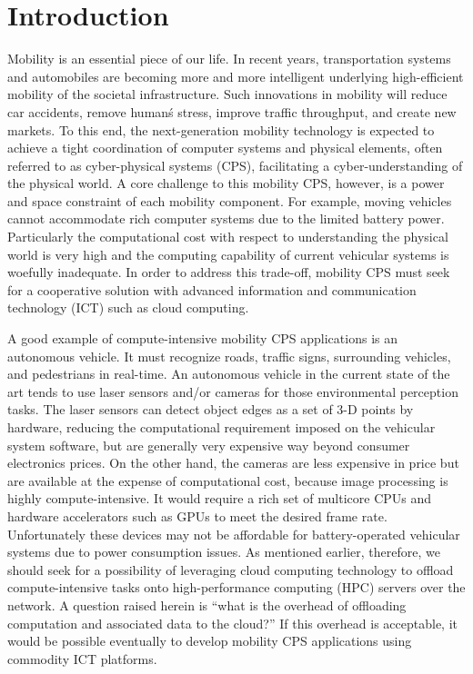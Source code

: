 \section{Introduction}
\label{sec:introduction}

Mobility is an essential piece of our life.
In recent years, transportation systems and automobiles are becoming
more and more intelligent underlying high-efficient mobility of the
societal infrastructure.
Such innovations in mobility will reduce car accidents, remove human\'s
stress, improve traffic throughput, and create new markets.
To this end, the next-generation mobility technology is expected to
achieve a tight coordination of computer systems and physical elements,
often referred to as cyber-physical systems (CPS), facilitating a
cyber-understanding of the physical world.
A core challenge to this mobility CPS, however, is a power and space
constraint of each mobility component.
For example, moving vehicles cannot accommodate rich computer systems
due to the limited battery power.
Particularly the computational cost with respect to understanding the
physical world is very high and the computing capability of current
vehicular systems is woefully inadequate.
In order to address this trade-off, mobility CPS must seek for a
cooperative solution with advanced information and communication
technology (ICT) such as cloud computing.

A good example of compute-intensive mobility CPS applications is an
autonomous vehicle.
It must recognize roads, traffic signs, surrounding vehicles, and
pedestrians in real-time.
An autonomous vehicle in the current state of the art tends to use laser
sensors and/or cameras for those environmental perception tasks.
The laser sensors can detect object edges as a set of 3-D points by
hardware, reducing the computational requirement imposed on the
vehicular system software, but are generally very expensive way beyond
consumer electronics prices.
On the other hand, the cameras are less expensive in price but are
available at the expense of computational cost, because image processing
is highly compute-intensive.
It would require a rich set of multicore CPUs and hardware accelerators
such as GPUs to meet the desired frame rate.
Unfortunately these devices may not be affordable for battery-operated
vehicular systems due to power consumption issues.
As mentioned earlier, therefore, we should seek for a possibility of
leveraging cloud computing technology to offload compute-intensive tasks
onto high-performance computing (HPC) servers over the network.
A question raised herein is ``what is the overhead of offloading
computation and associated data to the cloud?''
If this overhead is acceptable, it would be possible eventually to
develop mobility CPS applications using commodity ICT platforms.

